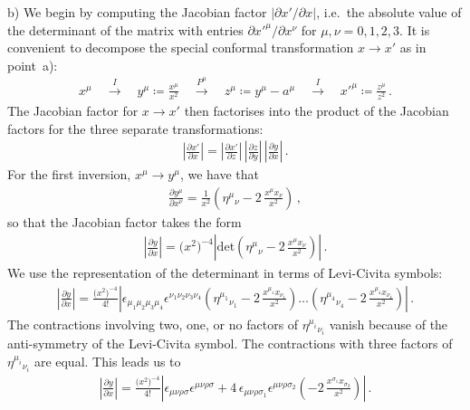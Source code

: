 \noindent
b) We begin by computing the Jacobian factor $|\partial x'/\partial x|$, i.e.\ the absolute value of the determinant of the matrix with entries $\partial x'^{\mu}/\partial x^{\nu}$ for $\mu,\nu=0,1,2,3$. It is convenient to decompose the special conformal transformation $x\to x'$ as in point~a):
\begin{align}
x^{\mu} \quad \overset{I}{\longrightarrow} \quad y^{\mu} \coloneqq \frac{x^{\mu}}{x^2} \quad \overset{P^{\mu}}{\longrightarrow} \quad z^{\mu} \coloneqq y^{\mu} - a^{\mu} 
\quad \overset{I}{\longrightarrow} \quad x'^{\mu} \coloneqq \frac{z^{\mu}}{z^2} \,.
\end{align}
The Jacobian factor for $x\to x'$ then factorises into the product of the Jacobian factors for the three separate transformations:
\begin{align}
\left| \frac{\partial x'}{\partial x} \right| = \left| \frac{\partial x'}{\partial z} \right| \, \left| \frac{\partial z}{\partial y} \right| \, \left| \frac{\partial y}{\partial x} \right| \,.
\end{align}
For the first inversion, $x^{\mu} \to y^{\mu}$, we have that
\begin{align}
\frac{\partial y^{\mu}}{\partial x^{\nu}} = \frac{1}{x^2}\left( \eta^{\mu}{}_{\nu} - 2 \, \frac{x^{\mu} x_{\nu}}{x^2} \right) \,,
\end{align}
so that the Jacobian factor takes the form
\begin{align}
\left| \frac{\partial y}{\partial x} \right| = \bigl(x^2\bigr)^{-4} \left| \mathrm{det}\left( \eta^{\mu}{}_{\nu} - 2 \, \frac{x^{\mu} x_{\nu}}{x^2} \right) \right| \,.
\end{align}
We use the representation of the determinant in terms of Levi-Civita symbols:
\begin{align}
\left| \frac{\partial y}{\partial x} \right| = \frac{\bigl(x^2\bigr)^{-4}}{4!} \left| 
  \epsilon_{\mu_1 \mu_2 \mu_3 \mu_4} \epsilon^{\nu_1 \nu_2 \nu_3 \nu_4}
  \left( \eta^{\mu_1}{}_{\nu_1} - 2 \, \frac{x^{\mu_1} x_{\nu_1}}{x^2} \right) \ldots  \left( \eta^{\mu_4}{}_{\nu_4} - 2 \, \frac{x^{\mu_4} x_{\nu_4}}{x^2} \right)  \right| \,.
\end{align}
The contractions involving two, one, or no factors of $\eta^{\mu_i}{}_{\nu_i}$ vanish because of the anti-symmetry of the Levi-Civita symbol.
The contractions with three factors of $\eta^{\mu_i}{}_{\nu_i}$ are equal. This leads us to
\begin{align}
\left| \frac{\partial y}{\partial x} \right| = \frac{\bigl(x^2\bigr)^{-4}}{4!} \left| 
  \epsilon_{\mu \nu \rho \sigma} \epsilon^{\mu \nu \rho \sigma} + 4 \, 
  \epsilon_{\mu \nu \rho \sigma_1} \epsilon^{\mu \nu \rho \sigma_2} \left( - 2 \, \frac{x^{\sigma_1} x_{\sigma_2}}{x^2} \right)
  \right| \,.
\end{align}
